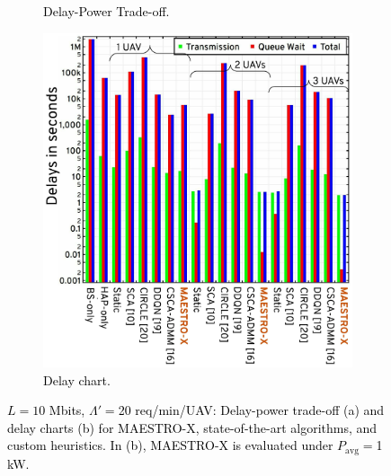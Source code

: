 \documentclass[10pt, twocolumn]{IEEEtran}
\theoremstyle{plain}
\theoremstyle{definition}
\theoremstyle{remark}
\newcommand\hlt[1]{\textcolor{black}{#1}}
\begin{document}
{\begin{figure} [t]
\begin{subfigure}{0.55\linewidth}
         \caption{\hlt{Delay-Power Trade-off.}}
         \label{F8a}
     \end{subfigure}
     \begin{subfigure}{0.448\linewidth}
         \centering
         \includegraphics[width=1.0\linewidth]{figs/Delay_Power_10Mb_Chart_High_Congestion.jpeg}
         \caption{\hlt{Delay chart.}}
         \label{F9a}
     \end{subfigure}
     \caption{\hlt{$L{=}10$ Mbits, $\Lambda'{=}$20 req/min/UAV: Delay-power trade-off (a) and delay charts (b) for MAESTRO-X, state-of-the-art algorithms, and custom heuristics. In (b), MAESTRO-X is evaluated under $P_{\mathrm{avg}}=$1 kW.}}
     \label{F8aF9a}
\end{figure}

}
\end{document}
